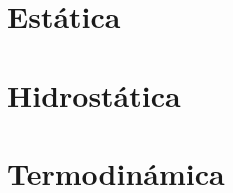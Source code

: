 \documentclass[12pt, a4paper, twoside]{book}
\begin{document}
\chapter{Estática}

% 
% 
% 

% 
% 
% 

% 
% 
% 

\chapter{Hidrostática}

% 
% 
% 

% 
% 
% 

% 
% 
% 

% 
% 
% 

\chapter{Termodinámica}

% 
% 
% 

% 
% 
% 
\end{document}
